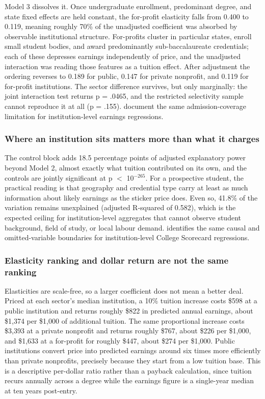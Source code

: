 Model 3 dissolves it. Once undergraduate enrollment, predominant degree, and state fixed effects are held constant, the for-profit elasticity falls from 0.400 to 0.119, meaning roughly 70\% of the unadjusted coefficient was absorbed by observable institutional structure. For-profits cluster in particular states, enroll small student bodies, and award predominantly sub-baccalaureate credentials; each of these depresses earnings independently of price, and the unadjusted interaction was reading those features as a tuition effect. After adjustment the ordering reverses to 0.189 for public, 0.147 for private nonprofit, and 0.119 for for-profit institutions. The sector difference survives, but only marginally: the joint interaction test returns p = .0465, and the restricted selectivity sample cannot reproduce it at all (p = .155). \textcite[pp.~35--37]{muse2024} document the same admission-coverage limitation for institution-level earnings regressions.

\subsubsection*{Where an institution sits matters more than what it charges}

The control block adds 18.5 percentage points of adjusted explanatory power beyond Model 2, almost exactly what tuition contributed on its own, and the controls are jointly significant at p $<$ 10$^{-265}$. For a prospective student, the practical reading is that geography and credential type carry at least as much information about likely earnings as the sticker price does. Even so, 41.8\% of the variation remains unexplained (adjusted R-squared of 0.582), which is the expected ceiling for institution-level aggregates that cannot observe student background, field of study, or local labour demand. \textcite[pp.~45--47]{faber2017} identifies the same causal and omitted-variable boundaries for institution-level College Scorecard regressions.

\subsubsection*{Elasticity ranking and dollar return are not the same ranking}

Elasticities are scale-free, so a larger coefficient does not mean a better deal. Priced at each sector's median institution, a 10\% tuition increase costs \$598 at a public institution and returns roughly \$822 in predicted annual earnings, about \$1,374 per \$1,000 of additional tuition. The same proportional increase costs \$3,393 at a private nonprofit and returns roughly \$767, about \$226 per \$1,000, and \$1,633 at a for-profit for roughly \$447, about \$274 per \$1,000. Public institutions convert price into predicted earnings around six times more efficiently than private nonprofits, precisely because they start from a low tuition base. This is a descriptive per-dollar ratio rather than a payback calculation, since tuition recurs annually across a degree while the earnings figure is a single-year median at ten years post-entry.

